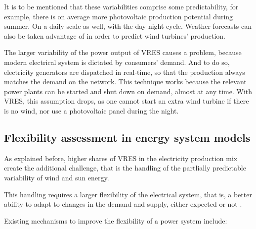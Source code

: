 It is to be mentioned that these variabilities comprise some predictability, for example, there is on average more photovoltaic production potential during summer. On a daily scale as well, with the day night cycle. Weather forecasts can also be taken advantage of in order to predict wind turbines' production.

The larger variability of the power output of VRES causes a problem, because modern electrical system is dictated by consumers' demand. And to do so, electricity generators are dispatched in real-time, so that the production always matches the demand on the network. This technique works because the relevant power plants can be started and shut down on demand, almost at any time. With VRES, this assumption drops, as one cannot start an extra wind turbine if there is no wind, nor use a photovoltaic panel during the night.

\subsection{Flexibility assessment in energy system models}

As explained before, higher shares of VRES in the electricity production mix create the additional challenge, that is the handling of the partlially predictable variability of wind and sun energy. 

This handling requires a larger flexibility of the electrical system, that is, a better ability to adapt to changes in the demand and supply, either expected or not \cite{irena}.

Existing mechanisms to improve the flexibility of a power system include:

